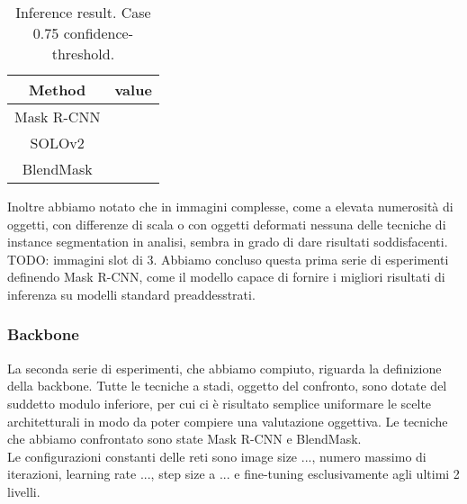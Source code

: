\documentclass[10pt,twocolumn,letterpaper]{article}
\begin{document}
\begin{table}[H]
\scriptsize
\begin{center}
\begin{tabular}{|c|c|}
\hline
Method & value\\
\hline\hline
Mask R-CNN & \\
\hline
SOLOv2 & \\
\hline
BlendMask & \\
\hline
\end{tabular}
\end{center}
\caption{Inference result. Case 0.75 confidence-threshold.}
\label{mytable_inference0.5}
\end{table}
Inoltre abbiamo notato che in immagini complesse, come a elevata numerosit\`a di oggetti, con differenze di scala o con oggetti deformati nessuna delle tecniche di instance segmentation in analisi, sembra in grado di dare risultati soddisfacenti. TODO: immagini slot di 3.
Abbiamo concluso questa prima serie di esperimenti definendo Mask R-CNN, come il modello capace di fornire i migliori risultati di inferenza su modelli standard preaddesstrati.



\subsubsection{Backbone}
\label{experiments:second_trial}
La seconda serie di esperimenti, che abbiamo compiuto, riguarda la definizione della backbone. Tutte le tecniche a stadi, oggetto del confronto, sono dotate del suddetto modulo inferiore, per cui ci \`e risultato semplice uniformare le scelte architetturali in modo da poter compiere una valutazione oggettiva. Le tecniche che abbiamo confrontato sono state Mask R-CNN e BlendMask.\\
Le configurazioni constanti delle reti sono image size ...,  numero massimo di iterazioni, learning rate ..., step size a ... e fine-tuning esclusivamente agli ultimi 2 livelli.
\end{document}
